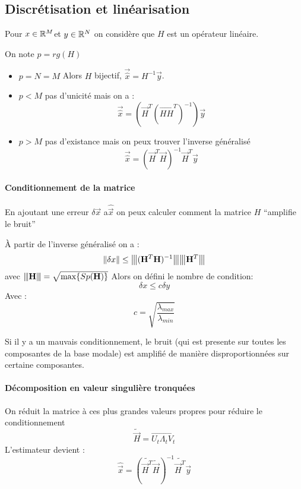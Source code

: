 \documentclass[main.tex]{subfiles}
\begin{document}
\subsection{Discrétisation et linéarisation}
Pour $x\in\mathbb{R}^M $et $y\in\mathbb{R}^N$ on considère que $H$ est un opérateur linéaire.
\begin{prop}
  On note $p=rg(H)$
  \begin{itemize}
  \item $ p = N=M$ Alors $H$ bijectif, $\vec{\hat{x}} = H^{-1}\vec{y}$.
  \item $ p <M$ pas d'unicité mais on a :
    \[
      \vec{\hat{x}} =(\vec{H}^T(\vec{HH}^T)^{-1})\vec{y}
    \]
  \item $ p>M$ pas d'existance mais on peux trouver l'inverse généralisé
    \[
      \vec{\hat{x}} = (\vec{H}^T\vec{H})^{-1}\vec{H}^T\vec{y}
    \]
  \end{itemize}
\end{prop}
\newcommand{\vertiii}[1]{{\left\vert\kern-0.25ex\left\vert\kern-0.25ex\left\vert #1 
    \right\vert\kern-0.25ex\right\vert\kern-0.25ex\right\vert}}
\paragraph{Conditionnement de la matrice}
En ajoutant une erreur $\delta\vec{x}$ a$\hat{\vec{x}}$ on peux calculer comment la matrice $H$ ``amplifie le bruit''

\begin{defin}
  À partir de l'inverse généralisé on a :
  \[
    \|\delta x \| \leq \vertiii{(\vec{H}^T\vec{H})^{-1}} \vertiii{\vec{H}^T}
  \]
  avec $\vertiii{\vec{H}} = \sqrt{\max\{Sp(\vec{H})\}}$
  Alors on défini le nombre de condition:
  \[
    \delta x \le c \delta y
  \]
  Avec :
  \[
    c =\sqrt{\frac{\lambda_{max}}{\lambda_{min}}}
  \]
\end{defin}


Si il y a un mauvais conditionnement, le bruit (qui est presente sur toutes les composantes de la base modale) est amplifié de manière disproportionnées sur certaine composantes.

\paragraph{Décomposition en valeur singulière tronquées} On réduit la matrice à ces plus grandes valeurs propres pour réduire le conditionnement
\[
  \tilde{\vec{H}}= \vec{U_t\Lambda_tV_t}
\]
L'estimateur devient :
\[
  \hat{\vec{x}} = (\tilde{\vec{H}^T}\tilde{\vec{H}})^{-1}\tilde{\vec{H}^T}\vec{y}
\]
\end{document}

